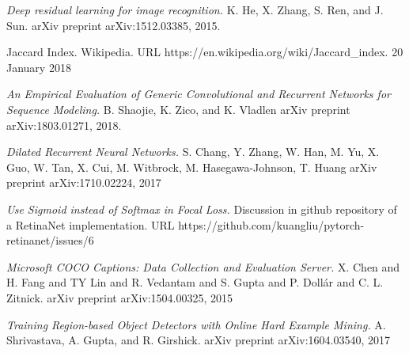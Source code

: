 \documentclass[a4paper, twoside]{article}
\begin{document}
\begin{thebibliography}{99}
	\textit{Deep residual learning for image recognition.}
    K. He, X. Zhang, S. Ren, and J. Sun. 
    arXiv preprint arXiv:1512.03385, 2015.

    
	Jaccard Index. Wikipedia.
    URL https://en.wikipedia.org/wiki/Jaccard{\_}index. 
    20 January 2018





	\textit{An Empirical Evaluation of Generic Convolutional and Recurrent Networks for Sequence Modeling.}
	B. Shaojie, K. Zico, and K. Vladlen
    arXiv preprint arXiv:1803.01271, 2018.
    
	\textit{Dilated Recurrent Neural Networks.}
	S. Chang, Y. Zhang, W. Han, M. Yu, X. Guo, W. Tan, X. Cui, M. Witbrock, M. Hasegawa-Johnson, T. Huang
	arXiv preprint arXiv:1710.02224, 2017
	
	
\textit{Use Sigmoid instead of Softmax in Focal Loss.}
Discussion in github repository of a RetinaNet implementation.
URL https://github.com/kuangliu/pytorch-retinanet/issues/6


	\textit{Microsoft COCO Captions: Data Collection and Evaluation Server.}
	X. Chen and H. Fang and TY Lin and R. Vedantam and S. Gupta and P. Dollár and C. L. Zitnick. 
	arXiv preprint arXiv:1504.00325, 2015

	\textit{Training Region-based Object Detectors with Online Hard Example Mining.}
	A. Shrivastava, A. Gupta, and R. Girshick. 
	arXiv preprint arXiv:1604.03540, 2017




\end{thebibliography}
\end{document}
